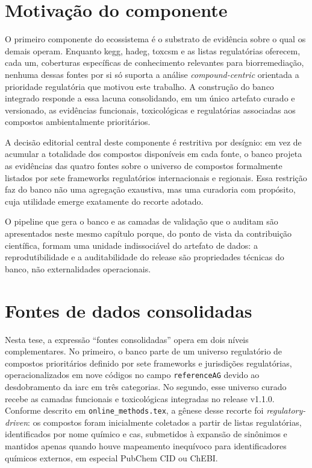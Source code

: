 \section{Motivação do componente}
\label{sec:c1-motivacao}

O primeiro componente do ecossistema \biorempp{} é o substrato de evidência sobre o qual os demais operam. Enquanto \gls{kegg}, \gls{hadeg}, \gls{toxcsm} e as listas regulatórias oferecem, cada um, coberturas específicas de conhecimento relevantes para biorremediação, nenhuma dessas fontes por si só suporta a análise \textit{compound-centric} orientada a prioridade regulatória que motivou este trabalho. A construção do banco integrado responde a essa lacuna consolidando, em um único artefato curado e versionado, as evidências funcionais, toxicológicas e regulatórias associadas aos compostos ambientalmente prioritários.

A decisão editorial central deste componente é restritiva por desígnio: em vez de acumular a totalidade dos compostos disponíveis em cada fonte, o banco projeta as evidências das quatro fontes sobre o universo de compostos formalmente listados por sete frameworks regulatórios internacionais e regionais. Essa restrição faz do banco não uma agregação exaustiva, mas uma curadoria com propósito, cuja utilidade emerge exatamente do recorte adotado.

O pipeline que gera o banco e as camadas de validação que o auditam são apresentados neste mesmo capítulo porque, do ponto de vista da contribuição científica, formam uma unidade indissociável do artefato de dados: a reprodutibilidade e a auditabilidade do release são propriedades técnicas do banco, não externalidades operacionais.

\section{Fontes de dados consolidadas}
\label{sec:c1-fontes}

Nesta tese, a expressão ``fontes consolidadas'' opera em dois níveis complementares. No primeiro, o banco parte de um universo regulatório de compostos prioritários definido por sete frameworks e jurisdições regulatórias, operacionalizados em nove códigos no campo \texttt{referenceAG} devido ao desdobramento da \gls{iarc} em três categorias. No segundo, esse universo curado recebe as camadas funcionais e toxicológicas integradas no release v1.1.0. Conforme descrito em \texttt{online\_methods.tex}, a gênese desse recorte foi \textit{regulatory-driven}: os compostos foram inicialmente coletados a partir de listas regulatórias, identificados por nome químico e \gls{cas}, submetidos à expansão de sinônimos e mantidos apenas quando houve mapeamento inequívoco para identificadores químicos externos, em especial PubChem CID ou ChEBI.

